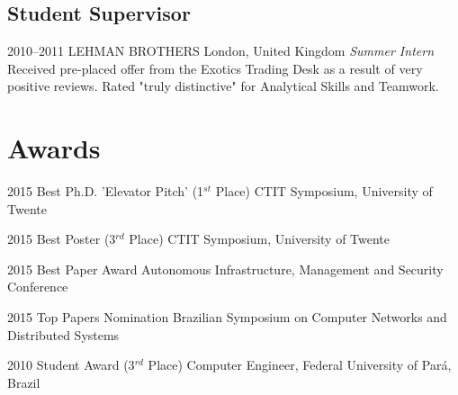 \documentclass[]{friggeri-cv} %
\begin{document}

\subsection{Student Supervisor}
\begin{entrylist}
\entry
{2010--2011}
{LEHMAN BROTHERS}
{London, United Kingdom}
{\emph{Summer Intern} \\
Received pre-placed offer from the Exotics Trading Desk as a result of very positive reviews. Rated "truly distinctive" for Analytical Skills and Teamwork.}
\end{entrylist}


\section{Awards}

\begin{entrylist}
\entry
{2015}
{Best Ph.D. 'Elevator Pitch' (1$^{st}$ Place)}
{CTIT Symposium, University of Twente}

\entry
{2015}
{Best Poster (3$^{rd}$ Place)}
{CTIT Symposium, University of Twente}

\entry
{2015}
{Best Paper Award}
{Autonomous Infrastructure, Management and Security Conference}

\entry
{2015}
{Top Papers Nomination}
{Brazilian Symposium on Computer Networks and Distributed Systems}

\entry
{2010}
{Student Award (3$^{rd}$ Place)}
{Computer Engineer, Federal University of Pará, Brazil}

\end{entrylist}

\end{document}

